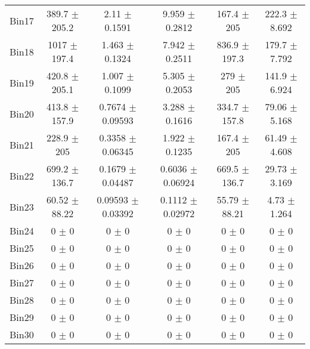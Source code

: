 \begin{tabular}{@{\extracolsep{4pt}}lccccc@{}}
     Bin17 & 389.7 $\pm$ 205.2 & 2.11 $\pm$ 0.1591 & 9.959 $\pm$ 0.2812 & 167.4 $\pm$ 205 & 222.3 $\pm$ 8.692 \\ 
     Bin18 & 1017 $\pm$ 197.4 & 1.463 $\pm$ 0.1324 & 7.942 $\pm$ 0.2511 & 836.9 $\pm$ 197.3 & 179.7 $\pm$ 7.792 \\ 
     Bin19 & 420.8 $\pm$ 205.1 & 1.007 $\pm$ 0.1099 & 5.305 $\pm$ 0.2053 & 279 $\pm$ 205 & 141.9 $\pm$ 6.924 \\ 
     Bin20 & 413.8 $\pm$ 157.9 & 0.7674 $\pm$ 0.09593 & 3.288 $\pm$ 0.1616 & 334.7 $\pm$ 157.8 & 79.06 $\pm$ 5.168 \\ 
     Bin21 & 228.9 $\pm$ 205 & 0.3358 $\pm$ 0.06345 & 1.922 $\pm$ 0.1235 & 167.4 $\pm$ 205 & 61.49 $\pm$ 4.608 \\ 
     Bin22 & 699.2 $\pm$ 136.7 & 0.1679 $\pm$ 0.04487 & 0.6036 $\pm$ 0.06924 & 669.5 $\pm$ 136.7 & 29.73 $\pm$ 3.169 \\ 
     Bin23 & 60.52 $\pm$ 88.22 & 0.09593 $\pm$ 0.03392 & 0.1112 $\pm$ 0.02972 & 55.79 $\pm$ 88.21 & 4.73 $\pm$ 1.264 \\ 
     Bin24 & 0 $\pm$ 0 & 0 $\pm$ 0 & 0 $\pm$ 0 & 0 $\pm$ 0 & 0 $\pm$ 0 \\ 
     Bin25 & 0 $\pm$ 0 & 0 $\pm$ 0 & 0 $\pm$ 0 & 0 $\pm$ 0 & 0 $\pm$ 0 \\ 
     Bin26 & 0 $\pm$ 0 & 0 $\pm$ 0 & 0 $\pm$ 0 & 0 $\pm$ 0 & 0 $\pm$ 0 \\ 
     Bin27 & 0 $\pm$ 0 & 0 $\pm$ 0 & 0 $\pm$ 0 & 0 $\pm$ 0 & 0 $\pm$ 0 \\ 
     Bin28 & 0 $\pm$ 0 & 0 $\pm$ 0 & 0 $\pm$ 0 & 0 $\pm$ 0 & 0 $\pm$ 0 \\ 
     Bin29 & 0 $\pm$ 0 & 0 $\pm$ 0 & 0 $\pm$ 0 & 0 $\pm$ 0 & 0 $\pm$ 0 \\ 
     Bin30 & 0 $\pm$ 0 & 0 $\pm$ 0 & 0 $\pm$ 0 & 0 $\pm$ 0 & 0 $\pm$ 0 \\ 
\hline\hline
  \end{tabular}

